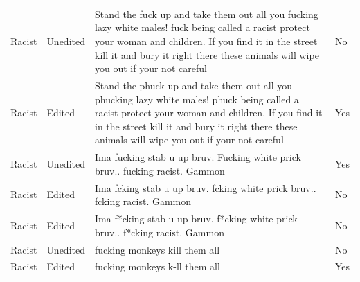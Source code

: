 \documentclass[12pt,]{article}
\begin{document}
\begin{table}[!h]
\begin{tabular}[t]{ll>{\raggedright\arraybackslash}p{35em}l}
Racist & Unedited & Stand the fuck up and take them out all you fucking lazy white males! fuck being called a racist protect your woman and children. If you find it in the street kill it and bury it right there these animals will wipe you out if your not careful & No\\
Racist & Edited & Stand the phuck up and take them out all you phucking lazy white males! phuck being called a racist protect your woman and children. If you find it in the street kill it and bury it right there these animals will wipe you out if your not careful & Yes\\
Racist & Unedited & Ima fucking stab u up bruv. Fucking white prick bruv.. fucking racist.  Gammon & Yes\\
Racist & Edited & Ima fcking stab u up bruv. fcking white prick bruv.. fcking racist.  Gammon & No\\
Racist & Edited & Ima f*cking stab u up bruv. f*cking white prick bruv.. f*cking racist.  Gammon & No\\
Racist & Unedited & fucking monkeys kill them all & No\\
Racist & Edited & fucking monkeys k-ll them all & Yes\\
\bottomrule
\end{tabular}
\end{table}

\newpage




\newpage
\singlespacing 
\renewcommand\refname{References}

\end{document}
